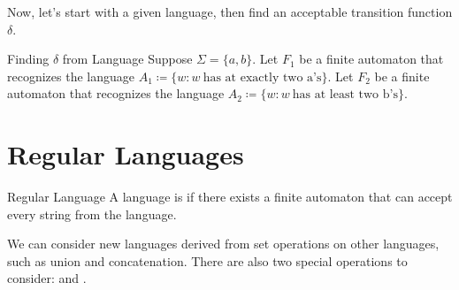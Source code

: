 \documentclass[12pt]{report}
\begin{document}
Now, let's start with a given language, then find an acceptable transition function $\delta$.
\begin{exbox}{Finding $\delta$ from Language}{}
    Suppose $\Sigma = \{a, b\}$. Let $F_1$ be a finite automaton that recognizes the language $A_1 \coloneq \{w : w\ \text{has at exactly two a's} \}$. Let $F_2$ be a finite automaton that recognizes the language $A_2 \coloneq \{w : w\ \text{has at least two b's} \}$.


\end{exbox}


\chapter{Regular Languages}

\begin{dfnbox}{Regular Language}{}
    A language is  if there exists a finite automaton that can accept every string from the language.
\end{dfnbox}

We can consider new languages derived from set operations on other languages, such as union and concatenation. There are also two special operations to consider:  and .
\end{document}
